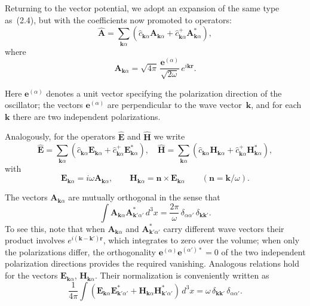 Returning to the vector potential, we adopt an expansion of the same type as~(2.4), but with the coefficients now promoted to operators:
\begin{equation}
\hat{\mathbf{A}} = \sum_{\mathbf{k}\alpha} (\hat{c}_{\mathbf{k}\alpha}\mathbf{A}_{\mathbf{k}\alpha} + \hat{c}_{\mathbf{k}\alpha}^+\mathbf{A}_{\mathbf{k}\alpha}^*),
\tag{2.17}
\end{equation}
where
\begin{equation}
\mathbf{A}_{\mathbf{k}\alpha} = \sqrt{4\pi}\,\frac{\mathbf{e}^{(\alpha)}}{\sqrt{2\omega}}\, e^{i\mathbf{kr}}.
\tag{2.18}
\end{equation}

Here $\mathbf{e}^{(\alpha)}$ denotes a unit vector specifying the polarization direction of the oscillator; the vectors $\mathbf{e}^{(\alpha)}$ are perpendicular to the wave vector~$\mathbf{k}$, and for each~$\mathbf{k}$ there are two independent polarizations.

Analogously, for the operators $\hat{\mathbf{E}}$ and $\hat{\mathbf{H}}$ we write
\begin{equation}
\hat{\mathbf{E}} = \sum_{\mathbf{k}\alpha} (\hat{c}_{\mathbf{k}\alpha}\mathbf{E}_{\mathbf{k}\alpha} + \hat{c}_{\mathbf{k}\alpha}^+\mathbf{E}_{\mathbf{k}\alpha}^*), \quad
\hat{\mathbf{H}} = \sum_{\mathbf{k}\alpha} (\hat{c}_{\mathbf{k}\alpha}\mathbf{H}_{\mathbf{k}\alpha} + \hat{c}_{\mathbf{k}\alpha}^+\mathbf{H}_{\mathbf{k}\alpha}^*),
\tag{2.19}
\end{equation}
with
\begin{equation}
\mathbf{E}_{\mathbf{k}\alpha} = i\omega\mathbf{A}_{\mathbf{k}\alpha}, \qquad \mathbf{H}_{\mathbf{k}\alpha} = \mathbf{n}\times\mathbf{E}_{\mathbf{k}\alpha} \qquad (\mathbf{n} = \mathbf{k}/\omega).
\tag{2.20}
\end{equation}

The vectors $\mathbf{A}_{\mathbf{k}\alpha}$ are mutually orthogonal in the sense that
\begin{equation}
\int \mathbf{A}_{\mathbf{k}\alpha}\mathbf{A}_{\mathbf{k}'\alpha'}^*\,d^3x = \frac{2\pi}{\omega}\,\delta_{\alpha\alpha'}\,\delta_{\mathbf{kk}'}.
\tag{2.21}
\end{equation}
To see this, note that when $\mathbf{A}_{\mathbf{k}\alpha}$ and $\mathbf{A}_{\mathbf{k}'\alpha'}^*$ carry different wave vectors their product involves $e^{i(\mathbf{k}-\mathbf{k}')\mathbf{r}}$, which integrates to zero over the volume; when only the polarizations differ, the orthogonality $\mathbf{e}^{(\alpha)}\mathbf{e}^{(\alpha')*} = 0$ of the two independent polarization directions provides the required vanishing. Analogous relations hold for the vectors $\mathbf{E}_{\mathbf{k}\alpha}$, $\mathbf{H}_{\mathbf{k}\alpha}$. Their normalization is conveniently written as
\begin{equation}
\frac{1}{4\pi}\int (\mathbf{E}_{\mathbf{k}\alpha}\mathbf{E}_{\mathbf{k}'\alpha'}^* + \mathbf{H}_{\mathbf{k}\alpha}\mathbf{H}_{\mathbf{k}'\alpha'}^*)\,d^3x = \omega\,\delta_{\mathbf{kk}'}\,\delta_{\alpha\alpha'}.
\tag{2.22}
\end{equation}

